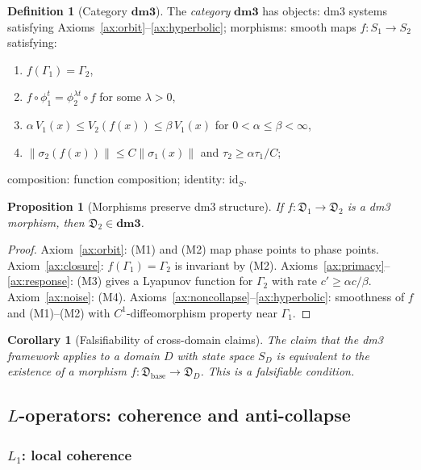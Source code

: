 \documentclass[12pt, oneside]{book}
\theoremstyle{plain}
\newtheorem{corollary}[theorem]{Corollary}
\newtheorem{proposition}[theorem]{Proposition}
\theoremstyle{definition}
\newtheorem{definition}{Definition}[section]
\theoremstyle{remark}
\newcommand{\dm}{\mathfrak{D}}
\newcommand{\dmcat}{\mathbf{dm3}}
\newcommand{\Orb}{\Gamma}
\newcommand{\norm}[1]{\left\|#1\right\|}
\begin{document}
\begin{definition}[Category $\dmcat$]\label{def:cat}
The \emph{category} $\dmcat$ has objects: dm3 systems satisfying
Axioms~\ref{ax:orbit}--\ref{ax:hyperbolic}; morphisms: smooth maps
$f\colon S_1\to S_2$ satisfying:
\begin{enumerate}[label=\textup{(M\arabic*)},leftmargin=2em]
  \item $f(\Orb_1)=\Orb_2$,
  \item $f\circ\phi_1^t=\phi_2^{\lambda t}\circ f$ for some $\lambda>0$,
  \item $\alpha\,V_1(x)\le V_2(f(x))\le\beta\,V_1(x)$ for
        $0<\alpha\le\beta<\infty$,
  \item $\norm{\sigma_2(f(x))}\le C\norm{\sigma_1(x)}$ and
        $\tau_2\ge\alpha\tau_1/C$;
\end{enumerate}
composition: function composition; identity: $\mathrm{id}_S$.
\end{definition}

\begin{proposition}[Morphisms preserve dm3 structure]\label{prop:morphism}
If $f\colon\dm_1\to\dm_2$ is a dm3 morphism, then $\dm_2\in\dmcat$.
\end{proposition}
\begin{proof}
Axiom~\ref{ax:orbit}: (M1) and (M2) map phase points to phase points.
Axiom~\ref{ax:closure}: $f(\Orb_1)=\Orb_2$ is invariant by (M2).
Axioms~\ref{ax:primacy}--\ref{ax:response}: (M3) gives a Lyapunov
function for $\Orb_2$ with rate $c'\ge\alpha c/\beta$.
Axiom~\ref{ax:noise}: (M4). Axioms~\ref{ax:noncollapse}--\ref{ax:hyperbolic}:
smoothness of $f$ and (M1)--(M2) with $C^1$-diffeomorphism property
near $\Orb_1$.
\end{proof}

\begin{corollary}[Falsifiability of cross-domain claims]\label{cor:false}
The claim that the dm3 framework applies to a domain $D$ with state
space $S_D$ is equivalent to the existence of a morphism
$f\colon\dm_{\mathrm{base}}\to\dm_D$. This is a falsifiable condition.
\end{corollary}

\subsection{\texorpdfstring{$L$}{L}-operators: coherence and anti-collapse}
\label{subsec:L}

\subsubsection{\texorpdfstring{$L_1$}{L1}: local coherence}
\end{document}
